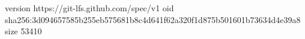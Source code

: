 version https://git-lfs.github.com/spec/v1
oid sha256:3d094657585b255eb575681b8c4d641f62a320f1d875b501601b73634d4e39a8
size 53410
